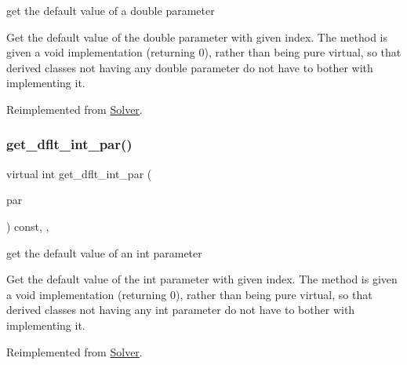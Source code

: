 get the default value of a double parameter 

Get the default value of the double parameter with given index. The method is given a void implementation (returning 0), rather than being pure virtual, so that derived classes not having any double parameter do not have to bother with implementing it. 

Reimplemented from \mbox{\hyperlink{class_s_m_spp__di__unipi__it_1_1_solver_a465a771c115acf8d5f4e32e22f003014}{Solver}}.

\mbox{\label{class_s_m_spp__di__unipi__it_1_1_c_d_a_solver_a75dd1491b74c4b9476755e061dce3e04}} 
\subsubsection{\texorpdfstring{get\+\_\+dflt\+\_\+int\+\_\+par()}{get\_dflt\_int\_par()}}
{\footnotesize\ttfamily virtual int get\+\_\+dflt\+\_\+int\+\_\+par (\begin{DoxyParamCaption}\item[{const \mbox{\hyperlink{class_s_m_spp__di__unipi__it_1_1_thin_compute_interface_aa3d710629ad8c434286726ad810c3b47}{idx\+\_\+type}}}]{par }\end{DoxyParamCaption}) const\hspace{0.3cm}{\ttfamily [inline]}, {\ttfamily [override]}, {\ttfamily [virtual]}}



get the default value of an int parameter 

Get the default value of the int parameter with given index. The method is given a void implementation (returning 0), rather than being pure virtual, so that derived classes not having any int parameter do not have to bother with implementing it. 

Reimplemented from \mbox{\hyperlink{class_s_m_spp__di__unipi__it_1_1_solver_a75dd1491b74c4b9476755e061dce3e04}{Solver}}.

\mbox{\label{class_s_m_spp__di__unipi__it_1_1_c_d_a_solver_a145672680f07ca7eef090900b8d6ddcf}} 

